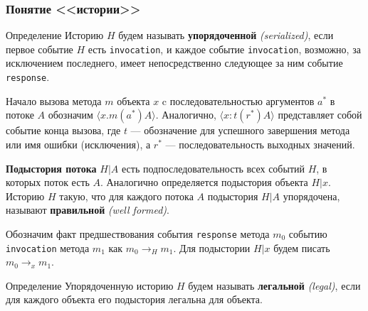 \documentclass[aspectratio=169, pdf, 8pt, unicode]{beamer}
\newcounter{defCnt}
\begin{document}
\begin{frame}
\frametitle{Понятие <<истории>>}

\begin{block}{Определение }
    Историю $H$ будем называть \textbf{упорядоченной} \textit{(serialized)}, если первое событие $H$ есть \texttt{invocation}, и каждое событие
    \texttt{invocation}, возможно, за исключением последнего, имеет непосредственно следующее за ним событие \texttt{response}.
\end{block}

Начало вызова метода $m$ объекта $x$ c последовательностью аргументов $a^*$ в потоке $A$ обозначим $\langle x.m(a^*)A \rangle$.
Аналогично, $\langle x \colon t(r^*)A \rangle$ представляет собой событие конца вызова, где $t$ ---
обозначение для успешного завершения метода или имя ошибки
(исключения), а $r^*$ --- последовательность выходных значений.

\textbf{Подыстория потока} $H|A$ есть подпоследовательность всех событий $H$, в которых поток есть $A$. Аналогично определяется
подыстория объекта $H|x$. Историю $H$ такую, что для каждого потока $A$ подыстория $H|A$ упорядочена, называют \textbf{правильной}
\textit{(well formed)}.

Обозначим факт предшествования события \texttt{response} метода $m_0$ событию \texttt{invocation} метода $m_1$ как $m_0 \to_H m_1$.
Для подыстории $H|x$ будем писать $m_0 \to_x m_1$.

\begin{block}{Определение }
    Упорядоченную историю $H$ будем называть \textbf{легальной} \textit{(legal)}, если для каждого объекта его подыстория легальна
    для объекта.
\end{block}

\end{frame}
\end{document}
